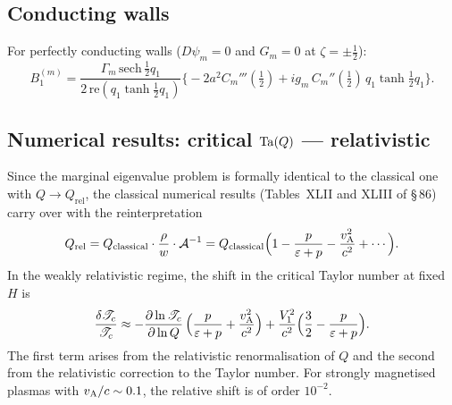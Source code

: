 \subsection{Conducting walls}
\label{sec:rel-88-conduct}

For perfectly conducting walls ($D\psi_m = 0$ and $G_m = 0$ at
$\zeta = \pm\frac{1}{2}$):
\begin{equation}
  B_1^{(m)} = \frac{\Gamma_m\,\mathrm{sech}\,\tfrac{1}{2}q_1}
    {2\,\mathrm{re}(q_1\tanh\tfrac{1}{2}q_1)}
    \bigl\{-2a^2 C_m'''(\tfrac{1}{2})
      + ig_m\,C_m''(\tfrac{1}{2})\,q_1\tanh\tfrac{1}{2}q_1\bigr\}.
  \label{eq:rel-9-253aR}
\end{equation}

\subsection{Numerical results: critical $\mathrm{Ta}(Q)$ --- relativistic}
\label{sec:rel-88-numerical}

Since the marginal eigenvalue problem is formally identical to the
classical one with $Q\to Q_{\mathrm{rel}}$, the classical numerical
results (Tables~XLII and XLIII of \S\,86) carry over with the
reinterpretation
\begin{equation}
  Q_{\mathrm{rel}}
  = Q_{\mathrm{classical}} \cdot \frac{\rho}{w}\cdot
    \mathcal{A}^{-1}
  = Q_{\mathrm{classical}}
    \Bigl(1 - \frac{p}{\varepsilon+p}
      - \frac{v_{\mathrm{A}}^2}{c^2} + \cdots\Bigr).
  \label{eq:rel-9-Qrel-expand}
\end{equation}
In the weakly relativistic regime, the shift in the critical Taylor
number at fixed $H$ is
\begin{equation}
  \frac{\delta\mathscr{T}_c}{\mathscr{T}_c}
  \approx -\frac{\partial\ln\mathscr{T}_c}{\partial\ln Q}\,
    \Bigl(\frac{p}{\varepsilon+p} + \frac{v_{\mathrm{A}}^2}{c^2}\Bigr)
  + \frac{V_1^2}{c^2}\Bigl(\frac{3}{2}
    -\frac{p}{\varepsilon+p}\Bigr).
  \label{eq:rel-9-Tc-shift}
\end{equation}
The first term arises from the relativistic renormalisation of $Q$
and the second from the relativistic correction to the Taylor number.
For strongly magnetised plasmas with $v_{\mathrm{A}}/c \sim 0.1$, the relative
shift is of order $10^{-2}$.

